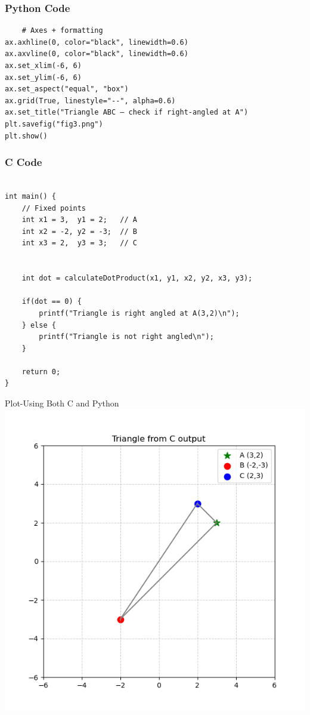 \documentclass{beamer}
\begin{document}
\begin{frame}[fragile]
    \frametitle{Python Code}
    \begin{lstlisting}
    # Axes + formatting
ax.axhline(0, color="black", linewidth=0.6)
ax.axvline(0, color="black", linewidth=0.6)
ax.set_xlim(-6, 6)
ax.set_ylim(-6, 6)
ax.set_aspect("equal", "box")
ax.grid(True, linestyle="--", alpha=0.6)
ax.set_title("Triangle ABC — check if right-angled at A")
plt.savefig("fig3.png")
plt.show()
    \end{lstlisting}
\end{frame}

\begin{frame}[fragile]
\frametitle{C Code}
\begin{lstlisting}

int main() {
    // Fixed points
    int x1 = 3,  y1 = 2;   // A
    int x2 = -2, y2 = -3;  // B
    int x3 = 2,  y3 = 3;   // C


    int dot = calculateDotProduct(x1, y1, x2, y2, x3, y3);

    if(dot == 0) {
        printf("Triangle is right angled at A(3,2)\n");
    } else {
        printf("Triangle is not right angled\n");
    }

    return 0;
}
\end{lstlisting}

\end{frame}


\begin{frame}{Plot-Using Both C and Python}
    \centering
    \includegraphics[width=\columnwidth, height=0.8\textheight, keepaspectratio]{fig3.1.png}     
\end{frame}
\end{document}
